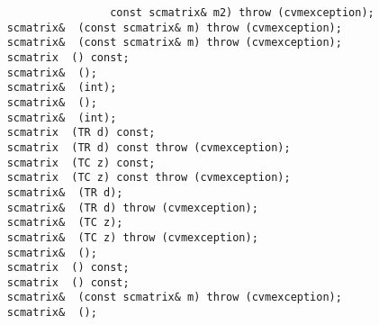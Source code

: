 \verb"                    const scmatrix& m2) throw (cvmexception);"\\
\verb"    scmatrix& "\verb" (const scmatrix& m) throw (cvmexception);"\\
\verb"    scmatrix& "\verb" (const scmatrix& m) throw (cvmexception);"\\
\verb"    scmatrix "\verb" () const;"\\
\verb"    scmatrix& "\verb" ();"\\
\verb"    scmatrix& "\verb" (int);"\\
\verb"    scmatrix& "\verb" ();"\\
\verb"    scmatrix& "\verb" (int);"\\
\verb"    scmatrix "\verb" (TR d) const;"\\
\verb"    scmatrix "\verb" (TR d) const throw (cvmexception);"\\
\verb"    scmatrix "\verb" (TC z) const;"\\
\verb"    scmatrix "\verb" (TC z) const throw (cvmexception);"\\
\verb"    scmatrix& "\verb" (TR d);"\\
\verb"    scmatrix& "\verb" (TR d) throw (cvmexception);"\\
\verb"    scmatrix& "\verb" (TC z);"\\
\verb"    scmatrix& "\verb" (TC z) throw (cvmexception);"\\
\verb"    scmatrix& "\verb" ();"\\
\verb"    scmatrix "\verb" () const;"\\
\verb"    scmatrix "\verb" () const;"\\
\verb"    scmatrix& "\verb" (const scmatrix& m) throw (cvmexception);"\\
\verb"    scmatrix& "\verb" ();"\\
